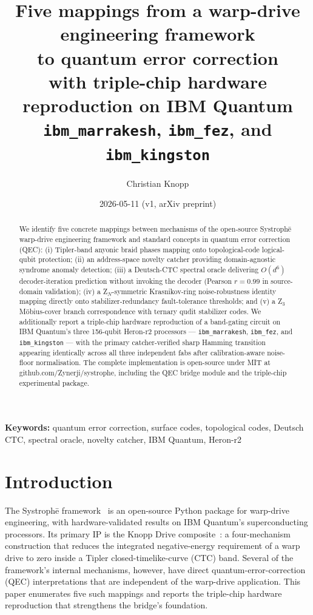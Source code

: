 \documentclass[11pt,a4paper]{article}
\title{\bfseries Five mappings from a warp-drive engineering framework \\
to quantum error correction \\
\large{with triple-chip hardware reproduction on IBM Quantum
\texttt{ibm\_marrakesh}, \texttt{ibm\_fez}, and \texttt{ibm\_kingston}}}
\author{Christian Knopp}
\affil{Independent researcher\\\texttt{cknopp@gmail.com}}
\date{2026-05-11 (v1, arXiv preprint)}
\begin{document}
\maketitle

\begin{abstract}
We identify five concrete mappings between mechanisms of the open-source Systroph\=e warp-drive engineering framework and standard concepts in quantum error correction (QEC): (i) Tipler-band anyonic braid phases mapping onto topological-code logical-qubit protection; (ii) an address-space novelty catcher providing domain-agnostic syndrome anomaly detection; (iii) a Deutsch-CTC spectral oracle delivering $O(d^{6})$ decoder-iteration prediction without invoking the decoder (Pearson $r=0.99$ in source-domain validation); (iv) a Z$_N$-symmetric Krasnikov-ring noise-robustness identity mapping directly onto stabilizer-redundancy fault-tolerance thresholds; and (v) a Z$_3$ M\"obius-cover branch correspondence with ternary qudit stabilizer codes. We additionally report a triple-chip hardware reproduction of a band-gating circuit on IBM Quantum's three 156-qubit Heron-r2 processors --- \texttt{ibm\_marrakesh}, \texttt{ibm\_fez}, and \texttt{ibm\_kingston} --- with the primary catcher-verified sharp Hamming transition appearing identically across all three independent fabs after calibration-aware noise-floor normalisation. The complete implementation is open-source under MIT at github.com/Zynerji/systrophe, including the QEC bridge module and the triple-chip experimental package.
\end{abstract}

\noindent\textbf{Keywords:} quantum error correction, surface codes, topological codes, Deutsch CTC, spectral oracle, novelty catcher, IBM Quantum, Heron-r2

\section{Introduction}

The Systroph\=e framework~\cite{SystropheRepo} is an open-source Python package for warp-drive engineering, with hardware-validated results on IBM Quantum's superconducting processors. Its primary IP is the Knopp Drive composite~\cite{KnoppDrive}: a four-mechanism construction that reduces the integrated negative-energy requirement of a warp drive to zero inside a Tipler closed-timelike-curve (CTC) band. Several of the framework's internal mechanisms, however, have direct quantum-error-correction (QEC) interpretations that are independent of the warp-drive application. This paper enumerates five such mappings and reports the triple-chip hardware reproduction that strengthens the bridge's foundation.
\end{document}
